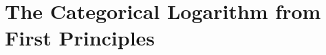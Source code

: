 
\chapter{The Categorical Logarithm from First Principles}
\label{chap:categorical-logarithm-frontier}

\providecommand{\Defcyc}{\mathrm{Def}_{\mathrm{cyc}}}
\providecommand{\Logsc}{\mathrm{Log}_{\mathrm{sc}}}
\providecommand{\Expsc}{\mathrm{Exp}_{\mathrm{sc}}}
\providecommand{\Philog}{\Phi_{\log}}
\providecommand{\cA}{\mathcal{A}}
\providecommand{\cB}{\mathcal{B}}
\providecommand{\cC}{\mathcal{C}}
\providecommand{\cH}{\mathcal{H}}
\providecommand{\cP}{\mathcal{P}}
\providecommand{\fg}{\mathfrak{g}}
\providecommand{\CC}{\mathbb{C}}
\providecommand{\Abar}{\overline{\mathcal{A}}}
\providecommand{\Ran}{\operatorname{Ran}}
\providecommand{\Eone}{\mathbb{E}_1}
\providecommand{\MC}{\mathrm{MC}}
\providecommand{\id}{\mathrm{id}}
\providecommand{\tr}{\mathrm{tr}}
\providecommand{\Hom}{\mathrm{Hom}}
\providecommand{\HH}{\mathrm{HH}}
\providecommand{\gr}{\mathrm{gr}}
\providecommand{\Vir}{\mathrm{Vir}}
\providecommand{\DS}{\mathrm{DS}}
\providecommand{\Com}{\mathrm{Com}}
\providecommand{\Span}{\mathrm{Span}}
\providecommand{\im}{\mathrm{im}}
\providecommand{\kerim}{\mathrm{ker}}
\providecommand{\Lie}{\mathrm{Lie}}
\providecommand{\Bin}{\mathrm{Bin}}
\providecommand{\ad}{\mathrm{ad}}
\providecommand{\End}{\mathrm{End}}
\providecommand{\op}{\mathrm{op}}
\providecommand{\Sym}{\mathrm{Sym}}
\providecommand{\rank}{\mathrm{rank}}
\providecommand{\codim}{\mathrm{codim}}
\providecommand{\Ob}{\mathrm{Ob}}
\providecommand{\Def}{\mathrm{Def}}
\providecommand{\Tot}{\mathrm{Tot}}
\providecommand{\Ahat}{\widehat{A}}
\providecommand{\ghat}{\widehat{\fg}}
\providecommand{\one}{\mathbf{1}}
\providecommand{\LamHodge}{\Lambda_{\mathrm{Hodge}}}

